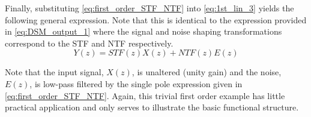 Finally, substituting \eqref{eq:first_order_STF_NTF} into \eqref{eq:1st_lin_3}
yields the following general expression. Note that this is identical to the
expression provided in \eqref{eq:DSM_output_1} where the signal and noise shaping
transformations correspond to the STF and NTF respectively.
\begin{equation}\label{eq:general_DSM_z_form}
 Y(z) = STF(z)X(z)+NTF(z)E(z)
\end{equation}

Note that the input signal, $X(z)$, is unaltered (unity gain) and the noise, $E(z)$, is
low-pass filtered by the single pole expression given in \eqref{eq:first_order_STF_NTF}.
Again, this trivial first order example has little practical application and only serves
to illustrate the basic functional structure.

